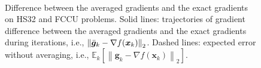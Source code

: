 \documentclass[aos]{imsart}
\numberwithin{equation}{section}
\theoremstyle{plain}
\begin{document}
    \begin{figure}[h!]
\\
    \caption{		
	 Difference between the averaged gradients and the exact gradients on HS32 and FCCU problems. Solid lines: trajectories of gradient difference between the averaged gradients and the exact gradients during iterations, i.e., $\left\| \Bar{\bm{g}}_k -\nabla f(\bm{x}_k)\right\|_2$. Dashed lines: expected error without averaging, i.e., $\mathbb{E}_k \left[\left\| \bm{g}_k -\nabla f(\bm{x}_k)\right\|_2 \right]$.}	
    \label{fig:avg_grad}
\end{figure} 
\end{document}

